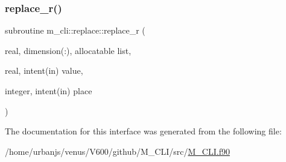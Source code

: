\mbox{\label{interfacem__cli_1_1replace_abf109545f37e44c1f6cc0176c75ef738}} 
\subsubsection{\texorpdfstring{replace\+\_\+r()}{replace\_r()}}
{\footnotesize\ttfamily subroutine m\+\_\+cli\+::replace\+::replace\+\_\+r (\begin{DoxyParamCaption}\item[{real, dimension(\+:), allocatable}]{list,  }\item[{real, intent(in)}]{value,  }\item[{integer, intent(in)}]{place }\end{DoxyParamCaption})\hspace{0.3cm}{\ttfamily [private]}}



The documentation for this interface was generated from the following file\+:\begin{DoxyCompactItemize}
\item 
/home/urbanjs/venus/\+V600/github/\+M\+\_\+\+C\+L\+I/src/\mbox{\hyperlink{M__CLI_8f90}{M\+\_\+\+C\+L\+I.\+f90}}\end{DoxyCompactItemize}
